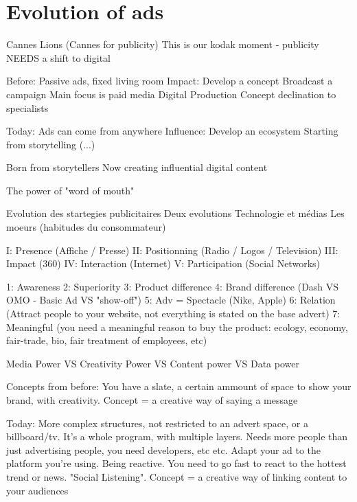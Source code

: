 \vspace{-1.2cm}

\section{Evolution of ads}

Cannes Lions (Cannes for publicity)
This is our kodak moment - publicity NEEDS a shift to digital

Before:
Passive ads, fixed living room
Impact:
    Develop a concept
    Broadcast a campaign
    Main focus is paid media
    Digital Production
    Concept declination to specialists

Today:
Ads can come from anywhere
Influence:
    Develop an ecosystem
    Starting from storytelling
    (...)

Born from storytellers
Now creating influential digital content

The power of "word of mouth"


Evolution des startegies publicitaires
    Deux evolutions
        Technologie et médias
        Les moeurs (habitudes du consommateur)

    I: Presence (Affiche / Presse)
    II: Positionning (Radio / Logos / Television)
    III: Impact (360)
    IV: Interaction (Internet)
    V: Participation (Social Networks)

    1: Awareness
    2: Superiority
    3: Product difference
    4: Brand difference (Dash VS OMO - Basic Ad VS "show-off")
    5: Adv = Spectacle (Nike, Apple)
    6: Relation (Attract people to your website, not everything is stated on the base advert)
    7: Meaningful (you need a meaningful reason to buy the product: ecology, economy, fair-trade, bio, fair treatment of employees, etc)

    Media Power VS Creativity Power VS Content power VS Data power

Concepts from before:
    You have a slate, a certain ammount of space to show your brand, with creativity.
    Concept = a creative way of saying a message

Today:
    More complex structures, not restricted to an advert space, or a billboard/tv. It's a whole program, with multiple layers. Needs more people than just advertising people, you need developers, etc etc.
    Adapt your ad to the platform you're using.
    Being reactive. You need to go fast to react to the hottest trend or news. "Social Listening".
    Concept = a creative way of linking content to your audiences

